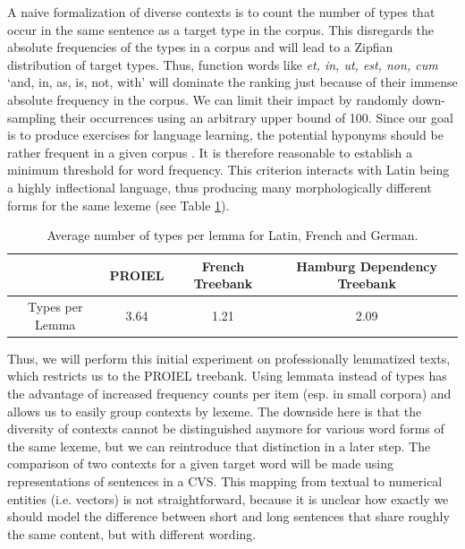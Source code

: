 \label{functionWordsZipfDistribution}
A naive formalization of diverse contexts is to count the number of types that occur in the same sentence as a target type in the corpus. This disregards the absolute frequencies of the types in a corpus and will lead to a Zipfian distribution \parencite[VI]{zipfPsychobiologyLanguageIntroduction1936} of target types. Thus, function words like \textit{et, in, ut, est, non, cum} `and, in, as, is, not, with' will dominate the ranking just because of their immense absolute frequency in the corpus. We can limit their impact by randomly down-sampling their occurrences using an arbitrary upper bound of 100.
\label{high_frequency_hyponyms_for_language_learning}
Since our goal is to produce exercises for language learning, the potential hyponyms should be rather frequent in a given corpus \parencites[27]{ellisUsagebasedLanguageInvestigating2013}[2]{robillardMonolingualBilingualChildren2014}. It is therefore reasonable to establish a minimum threshold for word frequency. This criterion interacts with Latin being a highly inflectional language, thus producing many morphologically different forms for the same lexeme (see Table \ref{tableTypesPerLemma}).
\begin{table}[ht]
	\begin{tabular}{ c | c | c | c }
  		 & PROIEL & French Treebank & Hamburg Dependency Treebank \\ \hline
  		Types per Lemma & 3.64 & 1.21 & 2.09 \\
	\end{tabular}
	\caption{Average number of types per lemma for Latin, French and German.}
	\label{tableTypesPerLemma}
\end{table}

Thus, we will perform this initial experiment on professionally lemmatized texts, which restricts us to the PROIEL treebank. Using lemmata instead of types has the advantage of increased frequency counts per item (esp. in small corpora) and allows us to easily group contexts by lexeme. The downside here is that the diversity of contexts cannot be distinguished anymore for various word forms of the same lexeme, but we can reintroduce that distinction in a later step. The comparison of two contexts for a given target word will be made using representations of sentences in a \gls{CVS}. This mapping from textual to numerical entities (i.e. vectors) is not straightforward, because it is unclear how exactly we should model the difference between short and long sentences that share roughly the same content, but with different wording. 

